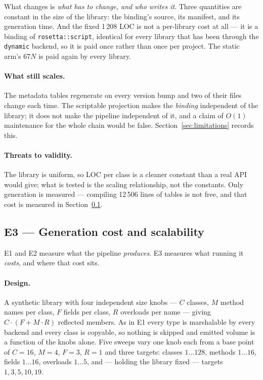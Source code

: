 \documentclass[11pt,a4paper]{article}
\newcommand{\code}[1]{\texttt{\small #1}}
\begin{document}
What changes is \emph{what has to change, and who writes it}. Three quantities
are constant in the size of the library: the binding's source, its manifest, and
its generation time. And the fixed 1\,208 LOC is not a per-library cost at all
--- it is a binding of \code{rosetta::script}, identical for every library that
has been through the \code{dynamic} backend, so it is paid once rather than once
per project. The static arm's $67N$ is paid again by every library.

\paragraph{What still scales.} The metadata tables regenerate on every version
bump and two of their files change each time. The scriptable projection makes
the \emph{binding} independent of the library; it does not make the pipeline
independent of it, and a claim of $O(1)$ maintenance for the whole chain would
be false. Section~\ref{sec:limitations} records this.

\paragraph{Threats to validity.} The library is uniform, so LOC per class is a
cleaner constant than a real API would give; what is tested is the scaling
relationship, not the constants. Only generation is measured --- compiling
12\,506 lines of tables is not free, and that cost is measured in
Section~\ref{sec:e3}.

\subsection{E3 --- Generation cost and scalability}
\label{sec:e3}

E1 and E2 measure what the pipeline \emph{produces}. E3 measures what running it
\emph{costs}, and where that cost sits.

\paragraph{Design.} A synthetic library with four independent size knobs ---
$C$ classes, $M$ method names per class, $F$ fields per class, $R$ overloads per
name --- giving $C\cdot(F + M\cdot R)$ reflected members. As in E1 every type is
marshalable by every backend and every class is copyable, so nothing is skipped
and emitted volume is a function of the knobs alone. Five sweeps vary one knob
each from a base point of $C=16$, $M=4$, $F=3$, $R=1$ and three targets: classes
$1\dots128$, methods $1\dots16$, fields $1\dots16$, overloads $1\dots5$, and ---
holding the library fixed --- targets $1, 3, 5, 10, 19$.
\end{document}
